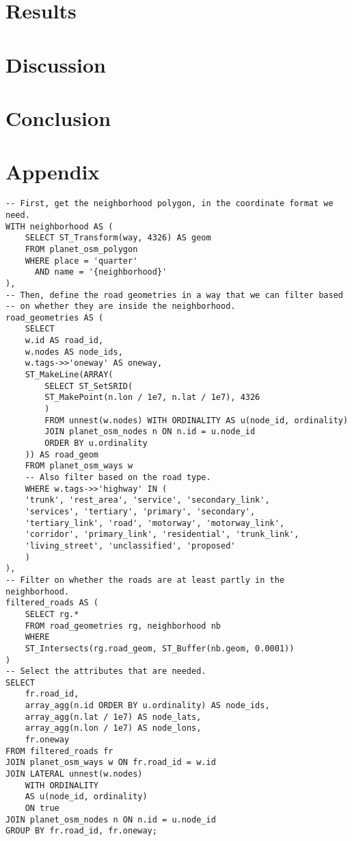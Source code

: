 \documentclass[12pt]{article}
\numberwithin{equation}{section}
\newcommand{\1}[1]{\,I_{#1}} %
\begin{document}
\section{Results}
\section{Discussion}
\section{Conclusion}


\section{Appendix}
\begin{lstlisting}[caption={The query to extract roads inside a neighborhood.}, label={lst:sql-roads}]
-- First, get the neighborhood polygon, in the coordinate format we need.
WITH neighborhood AS (
    SELECT ST_Transform(way, 4326) AS geom
    FROM planet_osm_polygon
    WHERE place = 'quarter'
      AND name = '{neighborhood}'
),
-- Then, define the road geometries in a way that we can filter based 
-- on whether they are inside the neighborhood.
road_geometries AS (
    SELECT
	w.id AS road_id,
	w.nodes AS node_ids,
	w.tags->>'oneway' AS oneway,
	ST_MakeLine(ARRAY(
	    SELECT ST_SetSRID(
		ST_MakePoint(n.lon / 1e7, n.lat / 1e7), 4326
		)
	    FROM unnest(w.nodes) WITH ORDINALITY AS u(node_id, ordinality)
	    JOIN planet_osm_nodes n ON n.id = u.node_id
	    ORDER BY u.ordinality
	)) AS road_geom
    FROM planet_osm_ways w
    -- Also filter based on the road type.
    WHERE w.tags->>'highway' IN (
	'trunk', 'rest_area', 'service', 'secondary_link',
	'services', 'tertiary', 'primary', 'secondary',
	'tertiary_link', 'road', 'motorway', 'motorway_link', 
	'corridor', 'primary_link', 'residential', 'trunk_link', 
	'living_street', 'unclassified', 'proposed'
    )
),
-- Filter on whether the roads are at least partly in the neighborhood.
filtered_roads AS (
    SELECT rg.*
    FROM road_geometries rg, neighborhood nb
    WHERE
	ST_Intersects(rg.road_geom, ST_Buffer(nb.geom, 0.0001))
)
-- Select the attributes that are needed.
SELECT
    fr.road_id,
    array_agg(n.id ORDER BY u.ordinality) AS node_ids,
    array_agg(n.lat / 1e7) AS node_lats,
    array_agg(n.lon / 1e7) AS node_lons,
    fr.oneway
FROM filtered_roads fr
JOIN planet_osm_ways w ON fr.road_id = w.id
JOIN LATERAL unnest(w.nodes) 
    WITH ORDINALITY 
    AS u(node_id, ordinality) 
    ON true
JOIN planet_osm_nodes n ON n.id = u.node_id
GROUP BY fr.road_id, fr.oneway;
\end{lstlisting}

\end{document}
